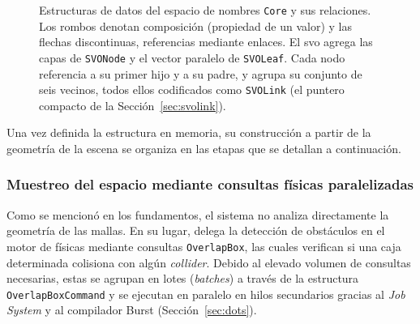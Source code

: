 \begin{figure}[htp]
  \caption[Estructuras de datos del espacio de nombres \texttt{Core} y sus relaciones.]
  {Estructuras de datos del espacio de nombres \texttt{Core} y sus relaciones.
  Los rombos denotan composición (propiedad de un valor) y las flechas discontinuas, referencias mediante enlaces.
  El \acrshort{svo} agrega las capas de \texttt{SVONode} y el vector paralelo de \texttt{SVOLeaf}. Cada nodo referencia a su primer hijo y a su padre, y agrupa su conjunto de seis vecinos, todos ellos codificados como \texttt{SVOLink} (el puntero compacto de la Sección~\ref{sec:svolink}).}
  \label{fig:core-clases}
\end{figure}

Una vez definida la estructura en memoria, su construcción a partir de la geometría de la escena se organiza en las etapas que se detallan a continuación.

\subsubsection{Muestreo del espacio mediante consultas físicas paralelizadas}

Como se mencionó en los fundamentos, el sistema no analiza directamente la geometría de las mallas.
En su lugar, delega la detección de obstáculos en el motor de físicas mediante consultas \texttt{OverlapBox}, las cuales verifican si una caja determinada colisiona con algún \textit{collider}.
Debido al elevado volumen de consultas necesarias, estas se agrupan en lotes (\textit{batches}) a través de la estructura \texttt{OverlapBoxCommand} y se ejecutan en paralelo en hilos secundarios gracias al \textit{Job System} y al compilador Burst (Sección~\ref{sec:dots}).

